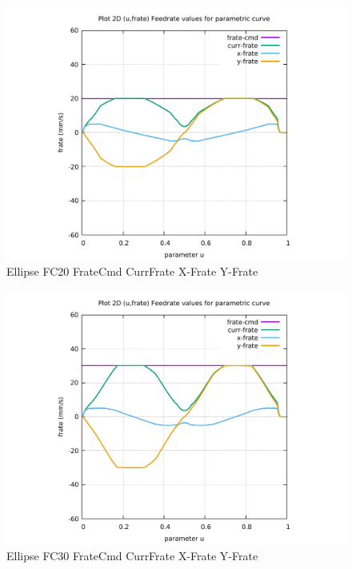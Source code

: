 \begin{figure}
	\caption     {Ellipse FC20 FrateCmd CurrFrate X-Frate Y-Frate}
	\label{28-img-Ellipse-FC20-FrateCmd-CurrFrate-X-Frate-Y-Frate.pdf}
	\includegraphics[width=1.00\textwidth]{Chap4/appendix/app-Ellipse/plots/28-img-Ellipse-FC20-FrateCmd-CurrFrate-X-Frate-Y-Frate.pdf}
\end{figure}


\clearpage
\pagebreak

\begin{figure}
	\caption     {Ellipse FC30 FrateCmd CurrFrate X-Frate Y-Frate}
	\label{29-img-Ellipse-FC30-FrateCmd-CurrFrate-X-Frate-Y-Frate.pdf}
	\includegraphics[width=1.00\textwidth]{Chap4/appendix/app-Ellipse/plots/29-img-Ellipse-FC30-FrateCmd-CurrFrate-X-Frate-Y-Frate.pdf}
\end{figure}


